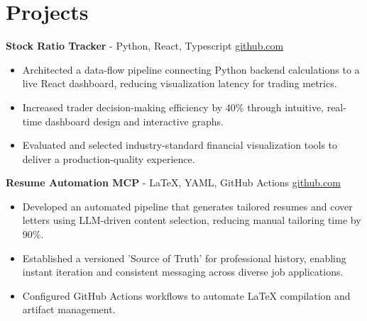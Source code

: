 \documentclass[11pt]{article}       %
\begin{document}

\vspace{-18.5pt}

\section*{Projects}

\textbf{Stock Ratio Tracker}{ - Python, React, Typescript} \hfill \href{https://github.com/Monica20030707/tradingDashboard-UI}{github.com} \\
\vspace{-9pt}
\begin{itemize}
  \item Architected a data-flow pipeline connecting Python backend calculations to a live React dashboard, reducing visualization latency for trading metrics.
  \item Increased trader decision-making efficiency by 40\% through intuitive, real-time dashboard design and interactive graphs.
  \item Evaluated and selected industry-standard financial visualization tools to deliver a production-quality experience.
\end{itemize}

\textbf{Resume Automation MCP}{ - LaTeX, YAML, GitHub Actions} \hfill \href{https://github.com/Monica20030707/Tex_OrangeLeaf-mcp}{github.com} \\
\vspace{-9pt}
\begin{itemize}
  \item Developed an automated pipeline that generates tailored resumes and cover letters using LLM-driven content selection, reducing manual tailoring time by 90\%.
  \item Established a versioned 'Source of Truth' for professional history, enabling instant iteration and consistent messaging across diverse job applications.
  \item Configured GitHub Actions workflows to automate LaTeX compilation and artifact management.
\end{itemize}
\end{document}
